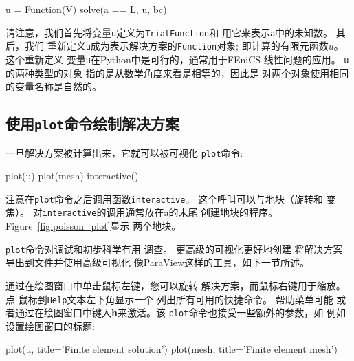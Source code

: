 \begin{python}
u = Function(V)
solve(a == L, u, bc)
\end{python}

请注意，我们首先将变量\texttt{u}定义为\texttt{TrialFunction}和
用它来表示\texttt{a}中的未知数。 其后，我们
重新定义\texttt{u}成为表示解决方案的\texttt{Function}对象;
即计算的有限元函数$u$。 这个重新定义
变量\texttt{u}在Python中是可行的，通常用于FEniCS
线性问题的应用。 \texttt{u}的两种类型的对象
指的是从数学角度来看是相等的，因此是
对两个对象使用相同的变量名称是自然的。


\subsection{使用\texttt{plot}命令绘制解决方案}


一旦解决方案被计算出来，它就可以被可视化
\texttt{plot}命令:

\begin{python}
plot(u)
plot(mesh)
interactive()
\end{python}
注意在\texttt{plot}命令之后调用函数\texttt{interactive}。
这个呼叫可以与地块（旋转和
变焦）。 对\texttt{interactive}的调用通常放在a的末尾
创建地块的程序。 Figure~\ref{fig:poisson_plot}显示
两个地块。


\texttt{plot}命令对调试和初步科学有用
调查。 更高级的可视化更好地创建
将解决方案导出到文件并使用高级可视化
像ParaView这样的工具，如下一节所述。

通过在绘图窗口中单击鼠标左键，您可以旋转
解决方案，而鼠标右键用于缩放。 点
鼠标到\texttt{Help}文本左下角显示一个
列出所有可用的快捷命令。 帮助菜单可能
或者通过在绘图窗口中键入\textbf{h}来激活。该
\texttt{plot}命令也接受一些额外的参数，如
例如设置绘图窗口的标题:

\begin{python}
plot(u, title='Finite element solution')
plot(mesh, title='Finite element mesh')
\end{python}

